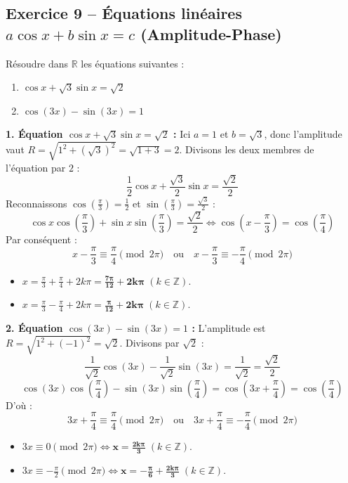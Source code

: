 \documentclass[11pt,a4paper]{article}
\newcommand{\Z}{\mathbb{Z}}
\newcommand{\R}{\mathbb{R}}
\begin{document}
\vspace{0.3cm}

\subsection*{Exercice 9 -- Équations linéaires $a\cos x + b\sin x = c$ (Amplitude-Phase)}

Résoudre dans $\R$ les équations suivantes :
\begin{enumerate}[label=\arabic*.]
    \item $\cos x + \sqrt{3}\sin x = \sqrt{2}$
    \item $\cos(3x) - \sin(3x) = 1$
\end{enumerate}

\begin{correctionbox}
\textbf{1. Équation $\cos x + \sqrt{3}\sin x = \sqrt{2}$ :}
Ici $a = 1$ et $b = \sqrt{3}$, donc l'amplitude vaut $R = \sqrt{1^2 + (\sqrt{3})^2} = \sqrt{1 + 3} = 2$.
Divisons les deux membres de l'équation par $2$ :
\[
\frac{1}{2} \cos x + \frac{\sqrt{3}}{2} \sin x = \frac{\sqrt{2}}{2}
\]
Reconnaissons $\cos\left(\frac{\pi}{3}\right) = \frac{1}{2}$ et $\sin\left(\frac{\pi}{3}\right) = \frac{\sqrt{3}}{2}$ :
\[
\cos x \cos\left(\frac{\pi}{3}\right) + \sin x \sin\left(\frac{\pi}{3}\right) = \frac{\sqrt{2}}{2} \iff \cos\left(x - \frac{\pi}{3}\right) = \cos\left(\frac{\pi}{4}\right)
\]
Par conséquent :
\[
x - \frac{\pi}{3} \equiv \frac{\pi}{4} \pmod{2\pi} \quad \text{ou} \quad x - \frac{\pi}{3} \equiv -\frac{\pi}{4} \pmod{2\pi}
\]
\begin{itemize}[label=$\bullet$]
    \item $x = \frac{\pi}{3} + \frac{\pi}{4} + 2k\pi = \mathbf{\frac{7\pi}{12} + 2k\pi} \; (k \in \Z)$.
    \item $x = \frac{\pi}{3} - \frac{\pi}{4} + 2k\pi = \mathbf{\frac{\pi}{12} + 2k\pi} \; (k \in \Z)$.
\end{itemize}

\textbf{2. Équation $\cos(3x) - \sin(3x) = 1$ :}
L'amplitude est $R = \sqrt{1^2 + (-1)^2} = \sqrt{2}$. Divisons par $\sqrt{2}$ :
\[
\frac{1}{\sqrt{2}} \cos(3x) - \frac{1}{\sqrt{2}} \sin(3x) = \frac{1}{\sqrt{2}} = \frac{\sqrt{2}}{2}
\]
\[
\cos(3x)\cos\left(\frac{\pi}{4}\right) - \sin(3x)\sin\left(\frac{\pi}{4}\right) = \cos\left(3x + \frac{\pi}{4}\right) = \cos\left(\frac{\pi}{4}\right)
\]
D'où :
\[
3x + \frac{\pi}{4} \equiv \frac{\pi}{4} \pmod{2\pi} \quad \text{ou} \quad 3x + \frac{\pi}{4} \equiv -\frac{\pi}{4} \pmod{2\pi}
\]
\begin{itemize}[label=$\bullet$]
    \item $3x \equiv 0 \pmod{2\pi} \iff \mathbf{x = \frac{2k\pi}{3}} \; (k \in \Z)$.
    \item $3x \equiv -\frac{\pi}{2} \pmod{2\pi} \iff \mathbf{x = -\frac{\pi}{6} + \frac{2k\pi}{3}} \; (k \in \Z)$.
\end{itemize}
\end{correctionbox}
\end{document}
